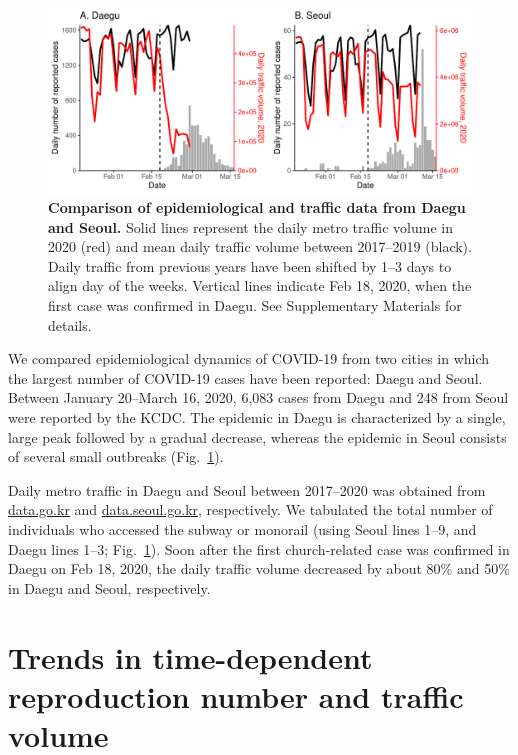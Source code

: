 \documentclass[12pt]{article}
\newcommand{\fref}[1]{Fig.~\ref{fig:#1}}
\begin{document}
\begin{figure}[!h]
\includegraphics[width=\textwidth]{figure_compare_report.pdf}
\caption{
\textbf{Comparison of epidemiological and traffic data from Daegu and Seoul.}
Solid lines represent the daily metro traffic volume in 2020 (red) and mean daily traffic volume between 2017--2019 (black).
Daily traffic from previous years have been shifted by 1--3 days to align day of the weeks.
Vertical lines indicate Feb 18, 2020, when the first case was confirmed in Daegu.
See Supplementary Materials for details.
}
\label{fig:data}
\end{figure}

We compared epidemiological dynamics of COVID-19 from two cities in which the largest number of COVID-19 cases have been reported: Daegu and Seoul.
Between January 20--March 16, 2020, 6,083 cases from Daegu and 248 from Seoul were reported by the KCDC.
The epidemic in Daegu is characterized by a single, large peak followed by a gradual decrease, whereas the epidemic in Seoul consists of several small outbreaks (\fref{data}).

Daily metro traffic in Daegu and Seoul between 2017--2020 was obtained from \url{data.go.kr} and \url{data.seoul.go.kr}, respectively.
We tabulated the total number of individuals who accessed the subway or monorail (using Seoul lines 1--9, and Daegu lines 1--3; \fref{data}).
Soon after the first church-related case was confirmed in Daegu on Feb 18, 2020, the daily traffic volume decreased by about 80\% and 50\% in Daegu and Seoul, respectively.


\section{Trends in time-dependent reproduction number and traffic volume}
\end{document}
